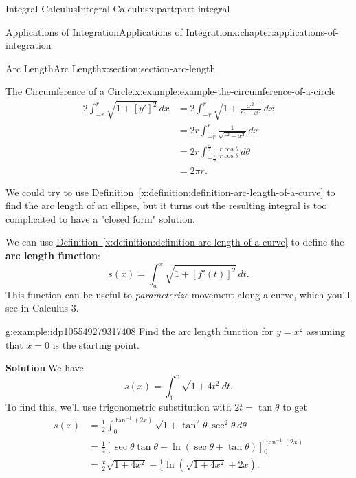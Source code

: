 \documentclass[twoside,10pt,]{book}
\newcommand{\blocktitlefont}{\relax}
\newcommand{\xreffont}{\relax}
\newcommand{\terminology}[1]{\textbf{#1}}
\numberwithin{equation}{part}
\newcommand{\amp}{&}
\begin{document}
\begin{partptx}{Integral Calculus}{}{Integral Calculus}{}{}{x:part:part-integral}
\begin{chapterptx}{Applications of Integration}{}{Applications of Integration}{}{}{x:chapter:applications-of-integration}
\begin{sectionptx}{Arc Length}{}{Arc Length}{}{}{x:section:section-arc-length}
\begin{example}{The Circumference of a Circle.}{x:example:example-the-circumference-of-a-circle}
\begin{align*}
2\int_{-r}^{r}\sqrt{1 + [y']^{2}}\,dx \amp = 2\int_{-r}^{r}\sqrt{1 + \frac{x^{2}}{r^{2} - x^{2}}}\,dx \\
\amp = 2r\int_{-r}^{r}\frac{1}{\sqrt{r^{2} - x^{2}}}\,dx \\
\amp = 2r\int_{-\frac{\pi}{2}}^{\frac{\pi}{2}}\frac{r\cos\theta}{r\cos\theta}\,d\theta \\
\amp = 2\pi r. 
\end{align*}
%
\end{example}
We could try to use \hyperref[x:definition:definition-arc-length-of-a-curve]{Definition~{\xreffont\ref{x:definition:definition-arc-length-of-a-curve}}} to find the arc length of an ellipse, but it turns out the resulting integral is too complicated to have a "closed form" solution.%
\par
We can use \hyperref[x:definition:definition-arc-length-of-a-curve]{Definition~{\xreffont\ref{x:definition:definition-arc-length-of-a-curve}}} to define the \terminology{arc length function}:%
\begin{equation*}
s(x) = \int_{a}^{x}\sqrt{1 + [f'(t)]^{2}}\,dt.
\end{equation*}
This function can be useful to \emph{parameterize} movement along a curve, which you'll see in Calculus 3.%
\begin{example}{}{g:example:idp105549279317408}%
Find the arc length function for \(y = x^{2}\) assuming that \(x = 0\) is the starting point.%
\par\smallskip%
\noindent\textbf{\blocktitlefont Solution}.\hypertarget{g:solution:idp105549279318688}{}\quad{}We have%
\begin{equation*}
s(x) = \int_{1}^{x}\sqrt{1 + 4t^{2}}\,dt.
\end{equation*}
To find this, we'll use trigonometric substitution with \(2t = \tan\theta\) to get%
\begin{align*}
s(x) \amp = \frac{1}{2}\int_{0}^{\tan^{-1}(2x)}\sqrt{1 + \tan^{2}\theta}\sec^{2}\theta\,d\theta \\
\amp = \frac{1}{4}\left[\sec\theta\tan\theta + \ln(\sec\theta + \tan\theta)\right]_{0}^{\tan^{-1}(2x)} \\
\amp = \frac{x}{2}\sqrt{1 + 4x^{2}} + \frac{1}{4}\ln(\sqrt{1 + 4x^{2}} + 2x). 
\end{align*}
%
\end{example}
\end{sectionptx}
%
%
\typeout{************************************************}

\end{chapterptx}
\end{partptx}
\end{document}
